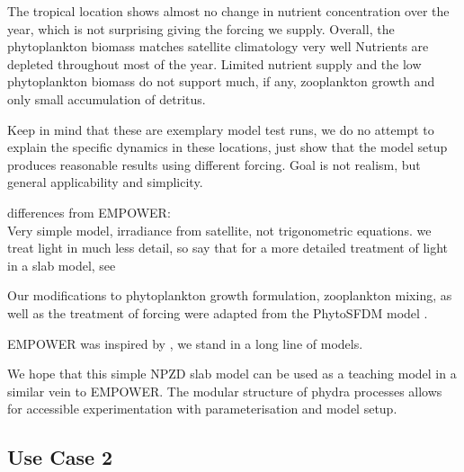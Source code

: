 \documentclass[template.tex]{subfiles}
\begin{document}
The tropical location shows almost no change in nutrient concentration over the year, which is not surprising giving the forcing we supply. 
Overall, the phytoplankton biomass matches satellite climatology very well 
Nutrients are depleted throughout most of the year.
Limited nutrient supply and the low phytoplankton biomass do not support much, if any, zooplankton growth and only small accumulation of detritus.

Keep in mind that these are exemplary model test runs, we do no attempt to explain the specific dynamics in these locations, just show that the model setup produces reasonable results using different forcing. Goal is not realism, but general applicability and simplicity. 





differences from EMPOWER: \\
Very simple model,
irradiance from satellite, not trigonometric equations. we treat light in much less detail, so say that for a more detailed treatment of light in a slab model, see \cite{Anderson2015c}

Our modifications to phytoplankton growth formulation, zooplankton mixing, as well as the treatment of forcing were adapted from the PhytoSFDM model \cite{Acevedo-Trejos2016}.

EMPOWER was inspired by \cite{Fasham1990a}, we stand in a long line of models. 

We hope that this simple NPZD slab model can be used as a teaching model in a similar vein to EMPOWER. The modular structure of phydra processes allows for accessible experimentation with parameterisation and model setup. 



\subsection{Use Case 2}

\end{document}
